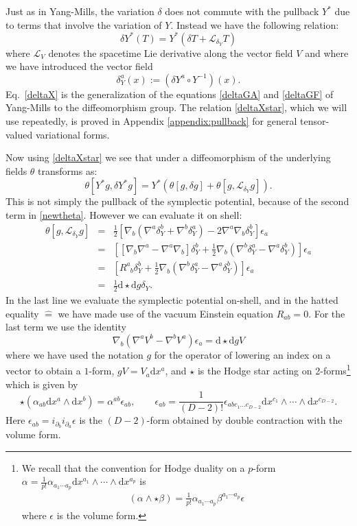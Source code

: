 \documentclass[a4paper,11pt]{article}
\newcommand{\be}{\begin{equation}}
\newcommand{\ee}{\end{equation}}
\newcommand{\beq}{\begin{eqnarray}}
\newcommand{\eeq}{\end{eqnarray}}
\def\rd{\mathrm{d}}
\def\pa{\partial}
\newcommand{\hateq}{\mathrel{\hat{=}}}
\begin{document}
Just as in Yang-Mills, the variation $\delta$ does not commute with the pullback $Y^*$ due to terms that involve the variation of $Y$.
Instead we have the following relation:
\begin{equation} \label{deltaXstar}
\delta Y^*(T) = Y^*(\delta T + \mathcal{L}_{\delta_Y}T)
\end{equation}
where $\mathcal{L}_V$ denotes the spacetime Lie derivative along the vector field $V$ and 
where we have introduced the vector field
\be \label{deltaX}
\delta_Y^{a}(x) := (\delta Y^{a}\circ Y^{-1})(x).
\ee
Eq.~\eqref{deltaX} is the generalization of the equations \eqref{deltaGA} and \eqref{deltaGF} of Yang-Mills to the diffeomorphism group. 
The relation \eqref{deltaXstar}, which we will use repeatedly, is proved in Appendix \ref{appendix:pullback} for general tensor-valued variational forms.

Now using \eqref{deltaXstar} we see that under a diffeomorphism of the underlying fields $\theta$ transforms as:
\be \label{newtheta}
\theta[Y^{*} g, \delta Y^{*} g] = Y^* \left(\theta[g, \delta g] + \theta[g, \mathcal{L}_{\delta_Y} g]\right).
\ee
This is not simply the pullback of the symplectic potential, because of the second term in \eqref{newtheta}.
However we can evaluate it on shell:
\begin{eqnarray}
\theta[g, \mathcal{L}_{\delta_Y}g] 
&=& \frac{1}{2} \left[ \nabla_b \left(\nabla^a \delta_Y^b +  \nabla^b \delta_Y^a\right) - 2 \nabla^a \nabla_b \delta_Y^b \right] \epsilon_a \nonumber \\
&=&  \left[  \left[\nabla_b \nabla^a -  \nabla^a \nabla_b \right]\delta_Y^b + \frac{1}{2} \nabla_b \left(  \nabla^b \delta_Y^a- \nabla^a \delta_Y^b \right) \right] \epsilon_a \nonumber \\
&=& \left[ R^a_{\phantom{a}b} \delta_Y^b  + \frac{1}{2} \nabla_b (\nabla^b \delta_Y^a - \nabla^a \delta_Y^b) \right] \epsilon_a \nonumber \\
&\hateq& \frac{1}{2} \rd \star \rd g \delta_Y. \label{thetadiff}
\end{eqnarray}
In the last line we evaluate the symplectic potential on-shell, and in the hatted equality $\hateq$ we have made use of the vacuum Einstein equation $R_{ab} = 0$.
For the last term we use the identity
\be
\nabla_{b}(\nabla^{a}V^{b}- \nabla^{b}V^{a}) \epsilon_{a}=  \rd \star \rd g V 
\ee
where we have used the notation $g$ for the operator of lowering an index on a vector to obtain a $1$-form, $g V = V_{a}\rd x^{a}$,  and $\star$ is the Hodge star acting on 2-forms\footnote{ We recall that the convention for Hodge duality on a $p$-form $\alpha = \frac1{p!} \alpha_{a_1\cdots a_p} \rd x^{a_1}\wedge  \cdots \wedge \rd x^{a_p} $ is 
\beq
(\alpha \wedge \star \beta) = \frac1{p!} \alpha_{a_1\cdots a_p} \beta^{a_1\cdots a_p} \epsilon
\eeq 
where $\epsilon$ is the volume form.} which is given by
\begin{equation}
\star (\alpha_{ab} \rd x^{a} \wedge \rd x^{b}) 
= \alpha^{ab}\epsilon_{ab},\qquad \epsilon_{ab} =   \frac{1}{(D-2)!} \epsilon_{abc_1 \ldots c_{D-2}} \rd x^{c_1} \wedge \cdots \wedge \rd x^{c_{D-2}}. 
\end{equation}
Here $\epsilon_{ab} = i_{\pa_b} i_{\pa_a}\epsilon$ is the  $(D-2)$-form obtained by double contraction with the volume form. 
\end{document}
